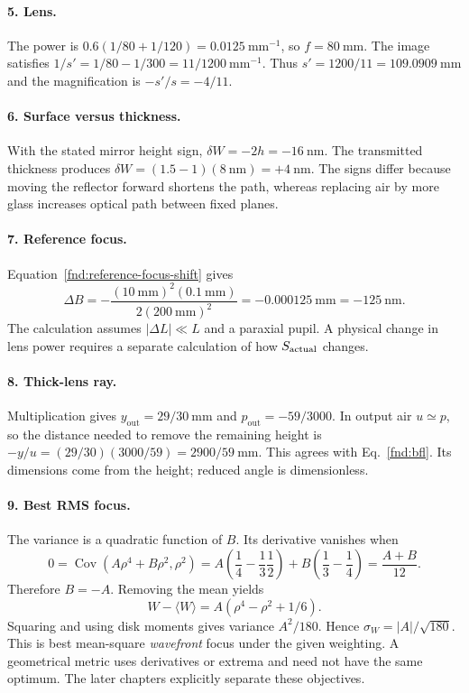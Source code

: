 \paragraph{5. Lens.}
The power is $0.6(1/80+1/120)=0.0125\ \mathrm{mm}^{-1}$, so $f=80\ \mathrm{mm}$. The image satisfies $1/s'=1/80-1/300=11/1200\ \mathrm{mm}^{-1}$. Thus $s'=1200/11=109.0909\ \mathrm{mm}$ and the magnification is $-s'/s=-4/11$.

\paragraph{6. Surface versus thickness.}
With the stated mirror height sign, $\delta W=-2h=-16\ \mathrm{nm}$. The transmitted thickness produces $\delta W=(1.5-1)(8\ \mathrm{nm})=+4\ \mathrm{nm}$. The signs differ because moving the reflector forward shortens the path, whereas replacing air by more glass increases optical path between fixed planes.

\paragraph{7. Reference focus.}
Equation~\eqref{fnd:reference-focus-shift} gives
\[
\Delta B=-\frac{(10\ \mathrm{mm})^2(0.1\ \mathrm{mm})}
{2(200\ \mathrm{mm})^2}=-0.000125\ \mathrm{mm}=-125\ \mathrm{nm}.
\]
The calculation assumes $|\Delta L|\ll L$ and a paraxial pupil. A physical change in lens power requires a separate calculation of how $S_{\rm actual}$ changes.

\paragraph{8. Thick-lens ray.}
Multiplication gives $y_{\mathrm{out}}=29/30\ \mathrm{mm}$ and $p_{\mathrm{out}}=-59/3000$. In output air $u\simeq p$, so the distance needed to remove the remaining height is $-y/u=(29/30)(3000/59)=2900/59\ \mathrm{mm}$. This agrees with Eq.~\eqref{fnd:bfl}. Its dimensions come from the height; reduced angle is dimensionless.

\paragraph{9. Best RMS focus.}
The variance is a quadratic function of $B$. Its derivative vanishes when
\[
0=\operatorname{Cov}(A\rho^4+B\rho^2,\rho^2)
=A\left(\frac14-\frac13\frac12\right)
+B\left(\frac13-\frac14\right)
=\frac{A+B}{12}.
\]
Therefore $B=-A$. Removing the mean yields
\[
W-\langle W\rangle=A(\rho^4-\rho^2+1/6).
\]
Squaring and using disk moments gives variance $A^2/180$. Hence $\sigma_W=|A|/\sqrt{180}$. This is best mean-square \emph{wavefront} focus under the given weighting. A geometrical metric uses derivatives or extrema and need not have the same optimum. The later chapters explicitly separate these objectives.

